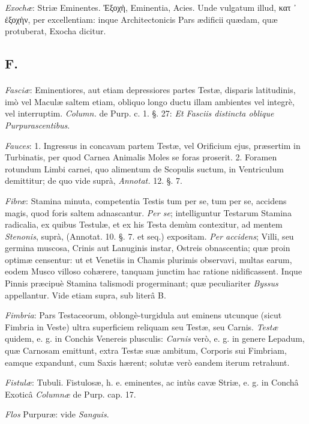 \documentclass[a4paper, 11pt, oneside, polutonikogreek, german]{article}
\begin{document}
\emph{Exochæ}: Striæ Eminentes. Ἐξοχὴ, Eminentia, Acies. Unde vulgatum illud, κατ ᾽ ἐξοχὴν, per excellentiam: inque Architectonicis Pars ædificii quædam, quæ protuberat, Exocha dicitur.

\subsection{F.}
\paragraph{}
\emph{Fasciæ}: Eminentiores, aut etiam depressiores partes Testæ, disparis latitudinis, imò vel Maculæ saltem etiam, obliquo longo ductu illam ambientes vel integrè, vel interruptim. \emph{Column.} de Purp. c. 1. §. 27: \emph{Et Fasciis distincta oblique Purpurascentibus}.

\emph{Fauces}: 1. Ingressus in concavam partem Testæ, vel Orificium ejus, præsertim in Turbinatis, per quod Carnea Animalis Moles se foras proserit. 2. Foramen rotundum Limbi carnei, quo alimentum de Scopulis suctum, in Ventriculum demittitur; de quo vide suprà, \emph{Annotat.} 12. §. 7.

\emph{Fibræ}: Stamina minuta, competentia Testis tum per se, tum per se, accidens magis, quod foris saltem adnascantur. \emph{Per se}; intelliguntur Testarum Stamina radicalia, ex quibus Testulæ, et ex his Testa demùm contexitur, ad mentem \emph{Stenonis}, suprà, (Annotat. 10. §. 7. et seq.) expositam. \emph{Per accidens}; Villi, seu germina muscosa, Crinis aut Lanuginis instar, Ostreis obnascentia; quæ proin optimæ censentur: ut et Venetiis in Chamis plurimis observavi, multas earum, eodem Musco villoso cohærere, tanquam junctim hac ratione nidificassent. Inque Pinnis præcipuè Stamina talismodi progerminant; quæ peculiariter \emph{Byssus} appellantur. Vide etiam supra, sub literâ B.

\emph{Fimbria}: Pars Testaceorum, oblongè-turgidula aut eminens utcunque (sicut Fimbria in Veste) ultra superficiem reliquam seu Testæ, seu Carnis. \emph{Testæ} quidem, e. g. in Conchis Venereis plusculis: \emph{Carnis} verò, e. g. in genere Lepadum, quæ Carnosam emittunt, extra Testæ suæ ambitum, Corporis sui Fimbriam, eamque expandunt, cum Saxis hærent; solutæ verò eandem iterum retrahunt.

\emph{Fistulæ}: Tubuli. Fistulosæ, h. e. eminentes, ac intùs cavæ Striæ, e. g. in Conchâ Exoticâ \emph{Columnæ} de Purp. cap. 17.

\emph{Flos} Purpuræ: vide \emph{Sanguis}.
\end{document}
